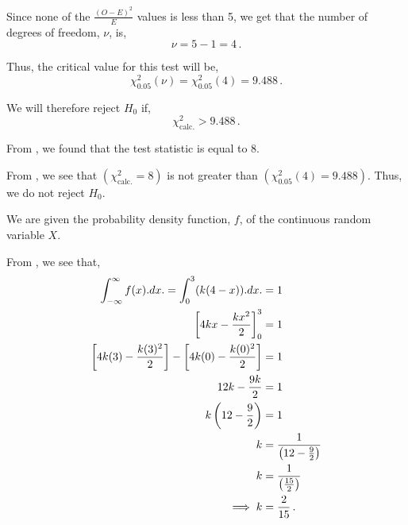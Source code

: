 \begin{subquestions}
\begin{subsubquestions}
Since none of the $\frac{(O-E)^2}{E}$ values is less than 5, we get that the number of degrees of freedom, $\nu$, is,
\begin{equation}
	\nu = 5-1=4 \,.
\end{equation}

Thus, the critical value for this test will be,
\begin{equation}
	\chi^{2}_{0.05} (\nu) = \chi^{2}_{0.05} (4) = 9.488 \,.
\end{equation}

We will therefore reject $H_0$ if,
\begin{equation}
	\chi^{2}_{\text{calc.}} > 9.488 \,. \label{2016:q4:CritReg}
\end{equation}


\subsubquestion

From , we found that the test statistic is equal to 8.


\subsubquestion

From , we see that $\left( \chi^{2}_{\text{calc.}}=8 \right)$ is not greater than $\left(\chi^{2}_{0.05} (4) = 9.488 \right)$. Thus, we do not reject $H_0$.

\end{subsubquestions}
	
	
\subquestion

We are given the probability density function, $f$, of the continuous random variable $X$.

\begin{subsubquestions}
	
\subsubquestion

From , we see that,
\begin{align}
	\int_{-\infty}^{\infty} f(x).dx. = \int_{0}^{3} (k(4-x)).dx. & = 1 \nonumber \\
	\left[ 4kx- \frac{kx^2}{2} \right]^3_0 & = 1 \nonumber \\
	\left[ 4k(3)- \frac{k(3)^2}{2} \right] - \left[ 4k(0)- \frac{k(0)^2}{2} \right] & = 1 \nonumber \\
	12k - \frac{9k}{2} & = 1 \nonumber \\
	k \left(12 - \frac{9}{2}\right) & = 1 \nonumber \\
	k & = \frac{1}{\left(12 - \frac{9}{2}\right)} \nonumber \\
	k & = \frac{1}{\left(\frac{15}{2}\right)} \nonumber \\
	\implies k & = \frac{2}{15} \,.
\end{align}
	

\end{subsubquestions}
\end{subquestions}
